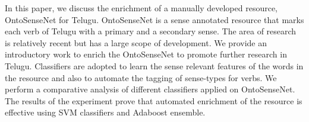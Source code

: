 In this paper, we discuss the enrichment of a manually developed resource, OntoSenseNet for Telugu. OntoSenseNet is a sense annotated resource that marks each verb of Telugu with a primary and a secondary sense. The area of research is relatively recent but has a large scope of development. We provide an introductory work to enrich the OntoSenseNet to promote further research in Telugu. Classifiers are adopted to learn the sense relevant features of the words in the resource and also to automate the tagging of sense-types for verbs. We perform a comparative analysis of different classifiers applied on OntoSenseNet. The results of the experiment prove that automated enrichment of the resource is effective using SVM classifiers and Adaboost ensemble.
